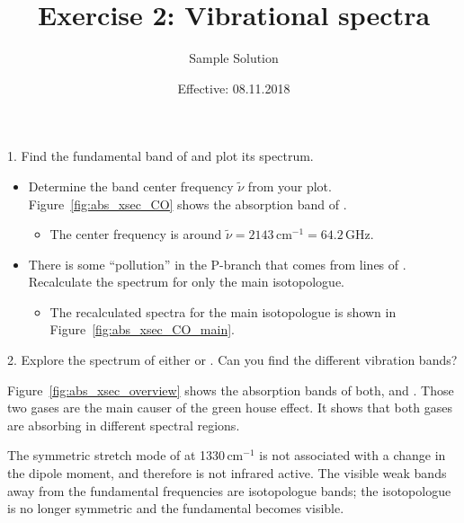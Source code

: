\documentclass[paper=a4, fontsize=11pt]{scrartcl} %
\title{Exercise 2: Vibrational spectra}
\author{Sample Solution}
\date{Effective: 08.11.2018}
\begin{document}
\maketitle

1. Find the fundamental band of  and plot its spectrum.
\begin{itemize}
  \item Determine the band center frequency $\tilde{\nu}$ from your plot.
    Figure~\ref{fig:abs_xsec_CO} shows the absorption band of .
    \begin{itemize}
      \item The center frequency is around
        $\tilde{\nu} = 2143\,\mathrm{cm}^{-1} = 64.2\,\mathrm{GHz}$.
    \end{itemize}

  \item There is some “pollution” in the P-branch that comes from lines
    of . Recalculate the spectrum for only the main isotopologue.
    \begin{itemize}
      \item The recalculated spectra for the main isotopologue is shown in
        Figure~\ref{fig:abs_xsec_CO_main}.
    \end{itemize}
\end{itemize}

2. Explore the spectrum of either  or . Can you find the
different vibration bands?

Figure~\ref{fig:abs_xsec_overview} shows the absorption bands of both,
 and . Those two gases are the main causer of the green
house effect. It shows that both gases are absorbing in different spectral
regions.

The symmetric stretch mode of  at 1330\,cm$^{-1}$ is not associated
with a change in the dipole moment, and therefore is not infrared active. The
visible weak bands away from the fundamental frequencies are isotopologue
bands; the isotopologue is no longer symmetric and the fundamental becomes
visible.
\end{document}
